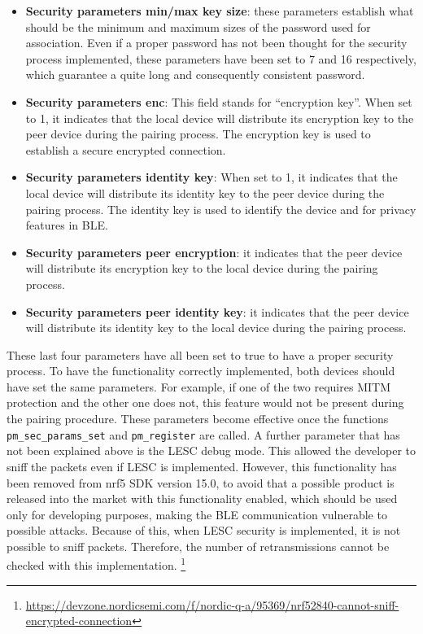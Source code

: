 \documentclass{Configuration_Files/PoliMi3i_thesis}
\begin{document}
\begin{itemize}
    \item \textbf{Security parameters min/max key size}: these parameters establish what should be the minimum and maximum sizes of the password used for association. Even if a proper password has not been thought for the security process implemented, these parameters have been set to 7 and 16 respectively, which guarantee a quite long and consequently consistent password.
    \item \textbf{Security parameters enc}: This field stands for ``encryption key''. When set to 1, it indicates that the local device will distribute its encryption key to the peer device during the pairing process. The encryption key is used to establish a secure encrypted connection.
    \item \textbf{Security parameters identity key}: When set to 1, it indicates that the local device will distribute its identity key to the peer device during the pairing process. The identity key is used to identify the device and for privacy features in BLE.
    \item \textbf{Security parameters peer encryption}: it indicates that the peer device will distribute its encryption key to the local device during the pairing process.
    \item \textbf{Security parameters peer identity key}: it indicates that the peer device will distribute its identity key to the local device during the pairing process.
\end{itemize}

These last four parameters have all been set to true to have a proper security process. To have the functionality correctly implemented, both devices should have set the same parameters. For example, if one of the two requires MITM protection and the other one does not, this feature would not be present during the pairing procedure. These parameters become effective once the functions \texttt{pm\_sec\_params\_set} and \texttt{pm\_register} are called. A further parameter that has not been explained above is the LESC debug mode. This allowed the developer to sniff the packets even if LESC is implemented. However, this functionality has been removed from nrf5 SDK version 15.0, to avoid that a possible product is released into the market with this functionality enabled, which should be used only for developing purposes, making the BLE communication vulnerable to possible attacks. Because of this, when LESC security is implemented, it is not possible to sniff packets. Therefore, the number of retransmissions cannot be checked with this implementation. \footnote{\url{https://devzone.nordicsemi.com/f/nordic-q-a/95369/nrf52840-cannot-sniff-encrypted-connection}}
\end{document}
